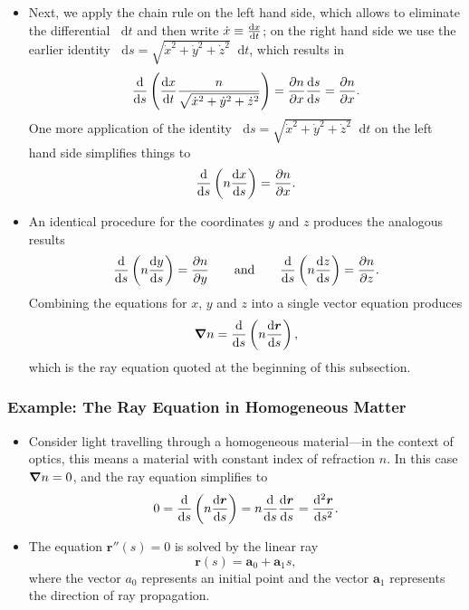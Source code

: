 \documentclass[11pt, a4paper]{article}
\newcommand{\diff}{\mathop{}\!\mathrm{d}} %
\renewcommand{\vec}[1]{\bm{#1}} %
\renewcommand{\r}{\vec{r}}  %
\begin{document}
\begin{itemize}
    \item Next, we apply the chain rule on the left hand side, which allows to eliminate the differential $ \diff t $ and then write $ \dot{x} \equiv \dv{x}{t} $; on the right hand side we use the earlier identity $ \diff s = \sqrt{\dot{x}^{2} + \dot{y}^{2} + \dot{z}^{2}} \diff t $, which results in
    \begin{equation*}
        \dv{s} \left( \dv{x}{t} \frac{n}{\sqrt{\dot{x}^{2} + \dot{y}^{2} + \dot{z}^{2}}} \right) = \pdv{n}{x} \dv{s}{s} = \pdv{n}{x}.
    \end{equation*}
    One more application of the identity $ \diff s = \sqrt{\dot{x}^{2} + \dot{y}^{2} + \dot{z}^{2}} \diff t $ on the left hand side simplifies things to
    \begin{equation*}
        \dv{s}\left( n \dv{x}{s} \right) = \pdv{n}{x}.
    \end{equation*}
    
    \item An identical procedure for the coordinates $ y $ and $ z $ produces the analogous results
    \begin{equation*}
        \dv{s}\left( n \dv{y}{s} \right) = \pdv{n}{y} \qquad \text{and} \qquad \dv{s}\left( n \dv{z}{s} \right) = \pdv{n}{z}.
    \end{equation*}
    Combining the equations for $ x $, $ y $ and $ z $ into a single vector equation produces
    \begin{equation*}
        \grad n = \dv{s} \left( n \dv{\r}{s} \right),
    \end{equation*}
    which is the ray equation quoted at the beginning of this subsection.
    
\end{itemize}

\subsubsection{Example: The Ray Equation in Homogeneous Matter}
\begin{itemize}
    \item Consider light travelling through a homogeneous material---in the context of optics, this means a material with constant index of refraction $ n $. In this case $ \grad n = 0 $, and the ray equation simplifies to
    \begin{equation*}
        0 = \dv{s} \left( n \dv{\r}{s} \right) = n \dv{s} \dv{\r}{s} = \dv[2]{\r}{s}.
    \end{equation*}
    
    \item The equation $ \r''(s) = 0 $ is solved by the linear ray
    \begin{equation*}
        \r(s) = \vec{a}_{0} + \vec{a}_{1}s,
    \end{equation*}
    where the vector $ a_{0} $ represents an initial point and the vector $ \vec{a}_{1} $ represents the direction of ray propagation.
    
\end{itemize}
\end{document}
